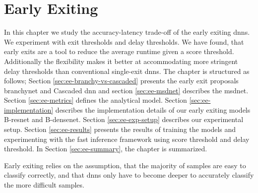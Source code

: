 \hypertarget{earlyexiting}{%
	\chapter{Early Exiting}\label{ch:earlyexit}}

In this chapter we study the accuracy-latency trade-off of the early exiting \gls{dnn}s. We experiment with exit thresholds and delay thresholds. We have found, that early exits are a tool to reduce the average runtime given a score threshold. Additionally the flexibility makes it better at accommodating more stringent delay thresholds than conventional single-exit \gls{dnn}s. The chapter is structured as follows; Section \ref{sec:ee-branchy-vs-cascaded} presents the early exit proposals \gls{branchynet} and Cascaded \gls{dnn} and section \ref{sec:ee-msdnet} describes the \gls{msdnet}. Section \ref{sec:ee-metrics} defines the analytical model. Section \ref{sec:ee-implementation} describes the implementation details of our early exiting models B-\gls{resnet} and B-\gls{densenet}. Section \ref{sec:ee-exp-setup} describes our experimental setup. Section \ref{sec:ee-results} presents the results of training the models and experimenting with the fast inference framework using score threshold and delay threshold. In Section \ref{sec:ee-summary}, the chapter is summarized.

Early exiting relies on the assumption, that the majority of samples are easy to classify correctly, and that \gls{dnn}s only have to become deeper to accurately classify the more difficult samples. 

